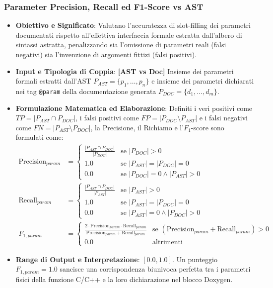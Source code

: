 \subsubsection{Parameter Precision, Recall ed F1-Score vs AST}
\label{subsubsec:param_metrics}
\begin{itemize}[leftmargin=*, label=\textbullet]
    \item \textbf{Obiettivo e Significato}: Valutano l'accuratezza di slot-filling dei parametri documentati rispetto all'effettiva interfaccia formale estratta dall'albero di sintassi astratta, penalizzando sia l'omissione di parametri reali (falsi negativi) sia l'invenzione di argomenti fittizi (falsi positivi).
    \item \textbf{Input e Tipologia di Coppia}: \textbf{[AST vs Doc]} Insieme dei parametri formali estratti dall'AST $P_{AST} = \{p_1, \dots, p_n\}$ e insieme dei parametri dichiarati nei tag \texttt{@param} della documentazione generata $P_{DOC} = \{d_1, \dots, d_m\}$.
    \item \textbf{Formulazione Matematica ed Elaborazione}: Definiti i veri positivi come $TP = |P_{AST} \cap P_{DOC}|$, i falsi positivi come $FP = |P_{DOC} \setminus P_{AST}|$ e i falsi negativi come $FN = |P_{AST} \setminus P_{DOC}|$, la Precisione, il Richiamo e l'$F_1$-score sono formulati come:
    \begin{align}
        \text{Precision}_{param} &= \begin{cases}
            \frac{|P_{AST} \cap P_{DOC}|}{|P_{DOC}|} & \text{se } |P_{DOC}| > 0 \\
            1.0 & \text{se } |P_{AST}| = |P_{DOC}| = 0 \\
            0.0 & \text{se } |P_{DOC}| = 0 \land |P_{AST}| > 0
        \end{cases} \label{eq:param_precision} \\
        \text{Recall}_{param} &= \begin{cases}
            \frac{|P_{AST} \cap P_{DOC}|}{|P_{AST}|} & \text{se } |P_{AST}| > 0 \\
            1.0 & \text{se } |P_{AST}| = |P_{DOC}| = 0 \\
            0.0 & \text{se } |P_{AST}| = 0 \land |P_{DOC}| > 0
        \end{cases} \label{eq:param_recall} \\
        F_{1, param} &= \begin{cases}
            \frac{2 \cdot \text{Precision}_{param} \cdot \text{Recall}_{param}}{\text{Precision}_{param} + \text{Recall}_{param}} & \text{se } (\text{Precision}_{param} + \text{Recall}_{param}) > 0 \\
            0.0 & \text{altrimenti}
        \end{cases} \label{eq:param_f1}
    \end{align}
    \item \textbf{Range di Output e Interpretazione}: $[0.0, 1.0]$. Un punteggio $F_{1, param} = 1.0$ sancisce una corrispondenza biunivoca perfetta tra i parametri fisici della funzione C/C++ e la loro dichiarazione nel blocco Doxygen.
\end{itemize}

